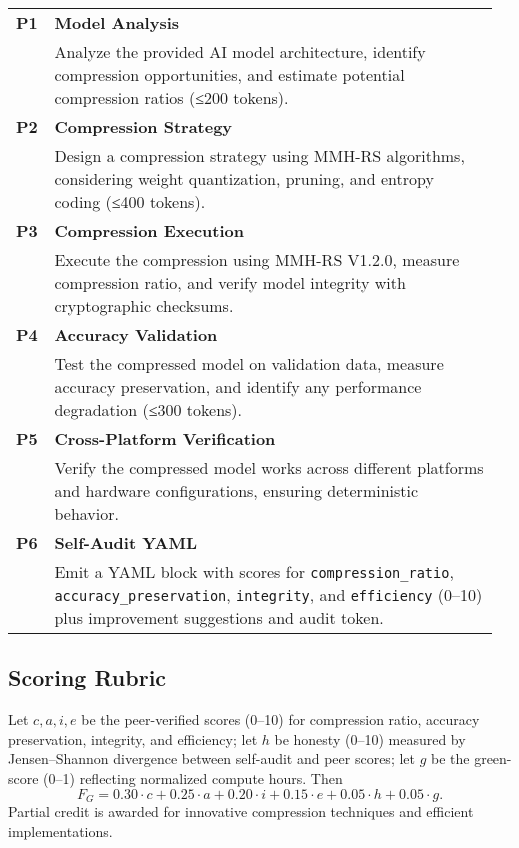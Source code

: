 \begingroup
  \small
  \begin{longtable}{@{}p{0.06\linewidth}@{\quad}R{0.9\linewidth}@{}}
    \textbf{P1} & \textbf{Model Analysis}\\
                & Analyze the provided AI model architecture, identify compression opportunities, and estimate potential compression ratios (≤200 tokens). \\[4pt]
    \textbf{P2} & \textbf{Compression Strategy}\\
                & Design a compression strategy using MMH-RS algorithms, considering weight quantization, pruning, and entropy coding (≤400 tokens).\\[4pt]
    \textbf{P3} & \textbf{Compression Execution}\\
                & Execute the compression using MMH-RS V1.2.0, measure compression ratio, and verify model integrity with cryptographic checksums.\\[4pt]
    \textbf{P4} & \textbf{Accuracy Validation}\\
                & Test the compressed model on validation data, measure accuracy preservation, and identify any performance degradation (≤300 tokens).\\[4pt]
    \textbf{P5} & \textbf{Cross-Platform Verification}\\
                & Verify the compressed model works across different platforms and hardware configurations, ensuring deterministic behavior.\\[4pt]
    \textbf{P6} & \textbf{Self-Audit YAML}\\
                & Emit a YAML block with scores for \texttt{compression\_ratio}, \texttt{accuracy\_preservation}, \texttt{integrity}, and \texttt{efficiency} (0–10) plus improvement suggestions and audit token.\\
  \end{longtable}
\endgroup

\subsection*{Scoring Rubric}
Let $c, a, i, e$ be the peer-verified scores (0–10) for compression ratio, accuracy preservation, integrity, and efficiency; let $h$ be honesty (0–10) measured by Jensen–Shannon divergence between self-audit and peer scores; let $g$ be the green-score (0–1) reflecting normalized compute hours. Then
\[
  F_G = 0.30 \cdot c + 0.25 \cdot a + 0.20 \cdot i + 0.15 \cdot e + 0.05 \cdot h + 0.05 \cdot g.
\]
Partial credit is awarded for innovative compression techniques and efficient implementations.

